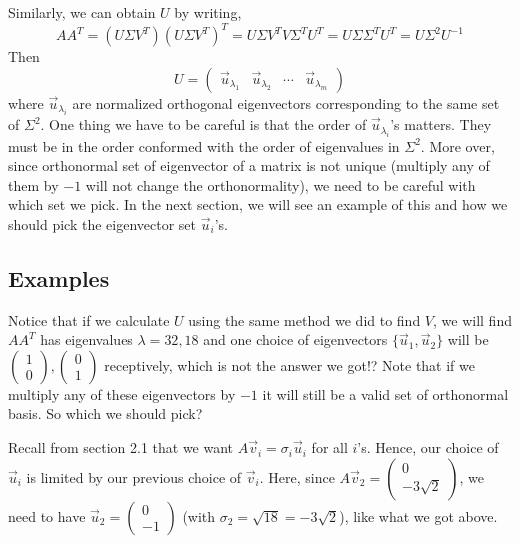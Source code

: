 \documentclass{article}
\begin{document}
Similarly, we can obtain $U$ by writing,
$$AA^T = (U \Sigma V^T)(U \Sigma V^T)^T = U \Sigma V^T V \Sigma^TU^T = U \Sigma  \Sigma^TU^T = U  \Sigma^2U^{-1}$$
Then 
$$U = \begin{pmatrix} \vec{u}_{\lambda_1} & \vec{u}_{\lambda_2} & \cdots & \vec{u}_{\lambda_m} \end{pmatrix}$$ 
where $\vec{u}_{\lambda_i}$ are normalized orthogonal eigenvectors corresponding to the same set of $\Sigma^2$. One thing we have to be careful is that the order of $\vec{u}_{\lambda_i}$'s matters. They must be in the order conformed with the order of eigenvalues in $\Sigma^2$. More over, since orthonormal set of eigenvector of a matrix is not unique (multiply any of them by $-1$ will not change the orthonormality), we need to be careful with which set we pick. In the next section, we will see an example of this and how we should pick the eigenvector set $\vec{u}_i$'s.

\subsection{Examples}

Notice that if we calculate $U$ using the same method we did to find $V$, we will find $AA^T$ has eigenvalues $\lambda = 32, 18$ and one choice of eigenvectors $\{ \vec{u}_1, \vec{u}_2 \}$  will be $\begin{pmatrix}  1 \\ 0 \end{pmatrix}, \begin{pmatrix}  0 \\ 1 \end{pmatrix}$ receptively, which is not the answer we got!? Note that if we multiply any of these eigenvectors by $-1$ it will still be a valid set of orthonormal basis. So which we should pick?

Recall from section 2.1 that we want $ A \vec{v}_i = \sigma_i \vec{u}_i$ for all $i$'s. Hence, our choice of $\vec{u}_i$ is limited by our previous choice of $\vec{v}_i$. Here, since $A\vec{v}_2= \begin{pmatrix} 0 \\  -3 \sqrt{2} \end{pmatrix}$, we need to have $\vec{u}_2 = \begin{pmatrix}   0 \\ -1 \end{pmatrix}$ (with $\sigma_2 = \sqrt{18} = -3 \sqrt{2}$), like what we got above.

\newpage
\end{document}
